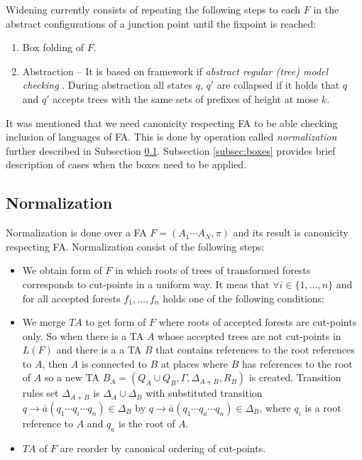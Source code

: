 Widening currently consists of repeating the following steps to each $F$ in the abstract configurations of a junction point until the fixpoint is reached:
\begin{enumerate}
		\item Box folding of $F$.
		\item Abstraction -- It is based on framework if \emph{abstract regular (tree) model checking} \cite{artcm}.
			During abstraction all states $q$, $q'$ are collapsed if it holds that
			$q$ and $q'$ accepts trees with the same sets of prefixes of height at mose $k$.
\end{enumerate}

It was mentioned that we need canonicity respecting FA to be able checking inclusion of languages of FA.
This is done by operation called \emph{normalization} further described in Subsection \ref{subsec:norm}.
Subsection \ref{subsec:boxes} provides brief description of cases when the boxes need to be applied.

\subsection{Normalization}
\label{subsec:norm}

Normalization is done over a FA $F = (A_1 \cdots A_N,\pi)$ and its result is canonicity respecting FA.
Normalization consist of the following steps:
\begin{itemize}
		\item We obtain form of $F$ in which roots of trees of transformed forests corresponds to
			cut-points in a uniform way.
			It meas that $\forall i \in \{1,\ldots,n\}$ and for all accepted forests $f_1,\ldots,f_n$ holds
			one of the following conditions:
		\item We merge $TA$ to get form of $F$ where roots of accepted forests are cut-points only.
			So when there is a TA $A$ whose accepted trees are not cut-points in $L(F)$ and there is
			a a TA $B$ that contains references to the root references to $A$, then $A$ is connected
			to $B$ at places where $B$ has references to the root of $A$ so a new
			TA $B_A = (Q_A \cup Q_B, \Gamma, \Delta_{A+B}, R_B)$ is created.
			Transition rules set $\Delta_{A+B}$ is $\Delta_A \cup \Delta_B$ with substituted transition $q \rightarrow  \overline{a} (q_1 \cdots q_i \cdots q_n) \in \Delta_B$
			by $q \rightarrow  \overline{a} (q_1 \cdots q_a \cdots q_n) \in \Delta_B$, where $q_i$ is a root reference to $A$ and $q_a$ is the root of $A$. 
		\item $TA$ of $F$ are reorder by canonical ordering of cut-points.
\end{itemize}

